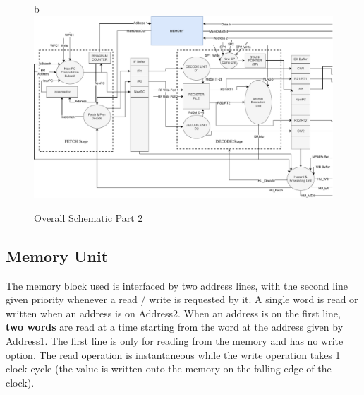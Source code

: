\documentclass[12pt]{article}
\theoremstyle{plain}
\theoremstyle{definition}
\begin{document}
    \begin{figure}b
        \centering
        \includegraphics[page=2]{Diagrams/SystemOverviewSplit}
        \caption{Overall Schematic Part 2}
        \label{sys-schematic-2}
    \end{figure}

\subsection{Memory Unit}
The memory block used is interfaced by two address lines, with the second line given priority whenever a read / write is requested by it. A single word is read or written when an address is on Address2. When an address is on the first line, \textbf{two words} are read at a time starting from the word at the address given by Address1. The first line is only for reading from the memory and has no write option. The read operation is instantaneous while the write operation takes 1 clock cycle (the value is written onto the memory on the falling edge of the clock). 
\end{document}
